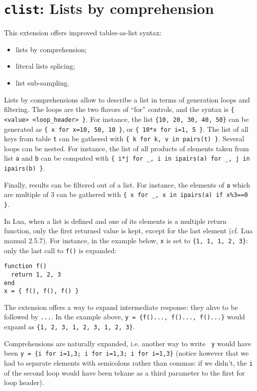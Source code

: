 \section{{\tt clist}: Lists by comprehension} 

This extension offers improved tables-as-list syntax:
\begin{itemize}
\item lists by comprehension;
\item literal lists splicing;
\item list sub-sampling.
\end{itemize}

Lists by comprehensions allow to describe a list in terms of
generation loops and filtering. The loops are the two flavors of
``for'' controls, and the syntax is {\tt\{ <value> <loop\_header>
  \}}. For instance, the list {\tt\{10, 20, 30, 40, 50\}} can be generated
as {\tt\{ x for x=10, 50, 10 \}}, or {\tt\{ 10*x for i=1, 5 \}}. The
list of all keys from table {\tt t} can be gathered with {\tt\{ k for
  k, v in pairs(t) \}}. Several loops can be nested. For instance, the
list of all products of elements taken from list {\tt a} and {\tt b}
can be computed with {\tt\{ i*j for \_, i in ipairs(a) for \_, j in
  ipairs(b) \}}.

Finally, results can be filtered out of a list. For instance, the
elements of {\tt a} which are multiple of 3 can be gathered with
{\tt\{ x for \_, x in ipairs(a) if x\%3==0 \}}.

In Lua, when a list is defined and one of its elements is a multiple
return function, only the first returned value is kept, except for the
last element (cf. Lua manual 2.5.7). For instance, in the example
below, {\tt x} is set to {\tt\{1, 1, 1, 2, 3\}}: only the last call to
{\tt f()} is expanded:

\begin{verbatim}
function f()
  return 1, 2, 3
end
x = { f(), f(), f() }
\end{verbatim}

The extension offers a way to expand intermediate response: they ahve
to be followed by {\tt...}. In the example above, {\tt y = \{f()...,
  f()..., f()...\}} would expand as {\tt\{1, 2, 3, 1, 2, 3, 1, 2,
  3\}}.

Comprehensions are naturally expanded, i.e. another way to write {\tt
  y} would have been {\tt y = \{i for i=1,3; i for i=1,3; i for
  i=1,3\}} (notice however that we had to separate elements with
semicolons rather than commas: if we didn't, the {\tt i} of the second
loop would have been tekane as a third parameter to the first for loop
header).

